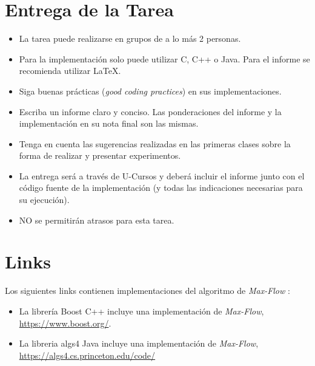 \documentclass[dcc,uchile]{fcfmcourse}
\begin{document}
\section{Entrega de la Tarea}
\begin{itemize}
    \item La tarea puede realizarse en grupos de a lo más 2 personas.
    \item Para la implementación solo puede utilizar C, C++ o Java. Para el informe se recomienda utilizar \LaTeX .
    \item Siga buenas prácticas (\textit{good coding practices}) en sus implementaciones.
    \item Escriba un informe claro y conciso. Las ponderaciones del informe y la implementación en su nota final son las mismas.
    \item Tenga en cuenta las sugerencias realizadas en las primeras clases sobre la forma de realizar y presentar experimentos.
    \item La entrega será a través de U-Cursos y deberá incluir el informe junto con el código fuente de la implementación (y todas las indicaciones necesarias para su ejecución).
    \item NO se permitirán atrasos para esta tarea.
\end{itemize}
\section{Links}\label{Links}Los siguientes links contienen implementaciones del algoritmo de \textit{Max-Flow} :
\begin{itemize}
    \item La librería Boost C++ incluye una implementación de \textit{Max-Flow}, \url{https://www.boost.org/}.
    \item La libreria algs4 Java incluye una implementación de \textit{Max-Flow}, \url{https://algs4.cs.princeton.edu/code/}
\end{itemize}
\end{document}
